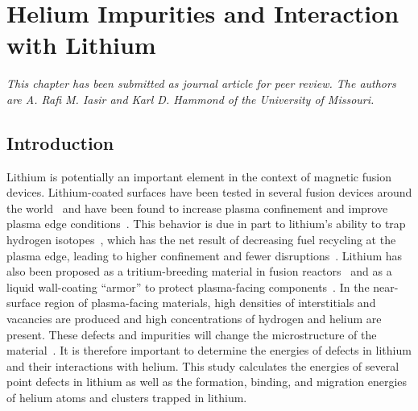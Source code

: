 \chapter{Helium Impurities and Interaction with Lithium}
\textit{This chapter has been submitted as journal article for peer review. The authors are A. Rafi M. Iasir and Karl D. Hammond of the University of Missouri.}

\section{Introduction}
Lithium is potentially an important element in the context of magnetic fusion
devices. Lithium-coated surfaces have been tested in several fusion devices
around the world~\cite{bell2009plasma, mirnov2003li, sanchez2009impact,
tuccillo2009overview, xu2011study, munaretto2012rfx} and have been found to
increase plasma confinement and improve plasma edge
conditions~\cite{allain2012lithium}.
This behavior is due in part to lithium's ability to trap hydrogen
isotopes~\cite{erents1971trapping}, which has the net result of decreasing
fuel recycling at the plasma edge, leading to higher confinement and fewer
disruptions~\cite{allain2012lithium}.
Lithium has also been proposed as a tritium-breeding material in fusion
reactors~\cite{hartley1978potential} and as a liquid wall-coating ``armor''
to protect plasma-facing components~\cite{Kessel2019}.
In the near-surface region of plasma-facing materials, high densities of
interstitials and vacancies are produced and high concentrations
of hydrogen and helium are present.
These defects and impurities will change the microstructure of the
material~\cite{Hammond2017c}.
It is therefore important to determine the energies of defects in lithium and
their interactions with helium.
This study calculates the energies of several point defects in lithium as
well as the formation, binding, and migration energies of helium atoms and
clusters trapped in lithium. 

